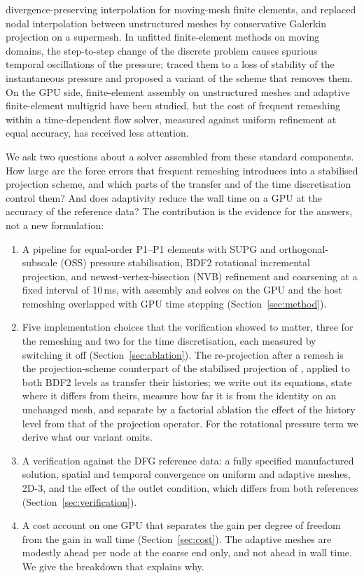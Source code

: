 \documentclass[preprint,12pt,number]{elsarticle}
\begin{document}
divergence-preserving interpolation for moving-mesh finite elements, and
\citet{farrell2009,farrell2011} replaced nodal interpolation between unstructured meshes by
conservative Galerkin projection on a supermesh. In unfitted finite-element methods on moving
domains, the step-to-step change of the discrete problem causes spurious temporal oscillations
of the pressure; \citet{olshanskii2025} traced them to a loss of stability of the instantaneous
pressure and proposed a variant of the scheme that removes them. On the GPU side, finite-element
assembly on unstructured meshes \citep{cecka2011,markall2013} and adaptive finite-element
multigrid \citep{liebchen2024} have been studied, but the cost of frequent remeshing within a
time-dependent flow solver, measured against uniform refinement at equal accuracy, has received
less attention.

We ask two questions about a solver assembled from these standard components. How large are
the force errors that frequent remeshing introduces into a stabilised projection scheme, and
which parts of the transfer and of the time discretisation control them? And does adaptivity
reduce the wall time on a GPU at the accuracy of the reference data? The contribution is the
evidence for the answers, not a new formulation:
\begin{enumerate}
\item A pipeline for equal-order P1--P1 elements with SUPG and orthogonal-subscale (OSS)
  pressure stabilisation, BDF2 rotational incremental projection, and newest-vertex-bisection
  (NVB) refinement and coarsening at a fixed interval of 10\,ms, with assembly and solves on the GPU and
  the host remeshing overlapped with GPU time stepping (Section~\ref{sec:method}).
\item Five implementation choices that the verification showed to matter, three for the
  remeshing and two for the time discretisation, each measured by switching it off
  (Section~\ref{sec:ablation}). The re-projection after a remesh is the projection-scheme
  counterpart of the stabilised projection of \citet{braack2013}, applied to both BDF2 levels
  as \citet{muller2019} transfer their histories; we write out its equations, state where it
  differs from theirs, measure how far it is from the identity on an unchanged mesh, and
  separate by a factorial ablation the effect of the history level from that of the projection
  operator. For the rotational pressure term we derive what our variant omits.
\item A verification against the DFG reference data: a fully specified manufactured solution,
  spatial and temporal convergence on uniform and adaptive meshes, 2D-3, and the effect of
  the outlet condition, which differs from both references (Section~\ref{sec:verification}).
\item A cost account on one GPU that separates the gain per degree of freedom from the gain in
  wall time (Section~\ref{sec:cost}). The adaptive meshes are modestly ahead per node at the
  coarse end only, and not ahead in wall time. We give the breakdown that explains why.
\end{enumerate}
\end{document}
